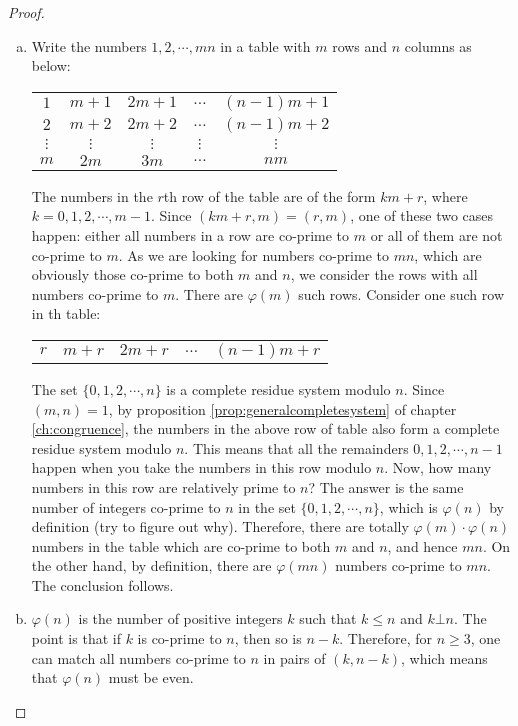 \documentclass[12pt]{subfile}
\begin{document}
		\begin{proof}
			$ $
			\begin{enumerate}[(a)]
				\item Write the numbers $1,2,\cdots,mn$ in a table with $m$ rows and $n$ columns as below:
					\begin{center}
						\begin{tabular}{ccccc}
							$1$ & $m+1$ & $2m+1$ & $\ldots$ & $(n-1)m+1$\\
							$2$ & $m+2$ & $2m+2$ & $\ldots$ & $(n-1)m+2$\\
							$\vdots$ & $\vdots$ & $\vdots$ & $\vdots$ & $\vdots$\\
							$m$ & $2m$ & $3m$ & $\ldots$ & $nm$						
						\end{tabular}
					\end{center}
				The numbers in the $r$th row of the table are of the form $km+r$, where $k=0,1,2,\cdots,m-1$. Since $(km+r,m)=(r,m)$, one of these two cases happen: either all numbers in a row are co-prime to $m$ or all of them are not co-prime to $m$. As we are looking for numbers co-prime to $mn$, which are obviously those co-prime to both $m$ and $n$, we consider the rows with all numbers co-prime to $m$. There are $\varphi(m)$ such rows. Consider one such row in th table:
					\begin{center}
						\begin{tabular}{ccccc}
							$r$ & $m+r$ & $2m+r$ & $\ldots$ & $(n-1)m+r$						
						\end{tabular}
					\end{center}
				The set $\{0, 1, 2, \cdots, n\}$ is a complete residue system modulo $n$. Since $(m,n)=1$, by proposition \eqref{prop:generalcompletesystem} of chapter \eqref{ch:congruence}, the numbers in the above row of table also form a complete residue system modulo $n$. This means that all the remainders $0,1,2,\cdots,n-1$ happen when you take the numbers in this row modulo $n$. Now, how many numbers in this row are relatively prime to $n$? The answer is the same number of integers co-prime to $n$ in the set $\{0, 1, 2, \cdots, n\}$, which is $\varphi(n)$ by definition (try to figure out why). Therefore, there are totally $\varphi(m) \cdot \varphi(n)$ numbers in the table which are co-prime to both $m$ and $n$, and hence $mn$. On the other hand, by definition, there are $\varphi(mn)$ numbers co-prime to $mn$. The conclusion follows.

				\item $\varphi(n)$ is the number of positive integers $k$ such that $k \leq n$ and $k \bot n$. The point is that if $k$ is co-prime to $n$, then so is $n-k$. Therefore, for $n\geq 3$, one can match all numbers co-prime to $n$ in pairs of $(k, n-k)$, which means that $\varphi(n)$ must be even.
				

\end{enumerate}
\end{proof}
\end{document}
